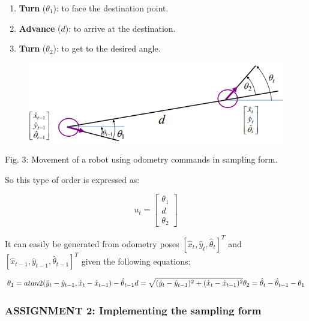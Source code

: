 \documentclass[11pt]{article}
\providecommand{\tightlist}{%
      \setlength{\itemsep}{0pt}\setlength{\parskip}{0pt}}
\begin{document}
\begin{enumerate}
\def\labelenumi{\arabic{enumi}.}
\tightlist
\item
  \textbf{Turn} (\(\theta_1\)): to face the destination point.
\item
  \textbf{Advance} (\(d\)): to arrive at the destination.
\item
  \textbf{Turn} (\(\theta_2\)): to get to the desired angle.
\end{enumerate}


\begin{figure}
\centering
\includegraphics{images/fig3-3-odometry_sample_form.PNG}
\end{figure}
Fig. 3: Movement of a robot using odometry commands in sampling form.

So this type of order is expressed as:

\[
    u_t = \begin{bmatrix}
            \theta_1  \\
            d \\
            \theta_2
        \end{bmatrix}
\]

It can easily be generated from odometry poses
\([\hat x_t, \hat y_t,\hat \theta_t]^T\) and
\([\hat x_{t-1}, \hat y_{t-1},\hat \theta_{t-1}]^T\) given the following
equations:

\[
    \begin{equation}
    \theta_1 =atan2(\hat y_t -\hat y_{t-1}, \hat x_t -\hat x_{t-1})- \hat \theta_{t-1} \\
    d = \sqrt{(\hat y_t -\hat y_{t-1})^2 + (\hat x_t -\hat x_{t-1})^2} \\
    \theta_2  = \hat{\theta}_t - \hat{\theta}_{t-1} - \theta_1
    \end{equation}
\]

    \hypertarget{assignment-2-implementing-the-sampling-form}{%
\subsubsection{\texorpdfstring{\textbf{{ASSIGNMENT 2: Implementing the
sampling
form}}}{ASSIGNMENT 2: Implementing the sampling form}}\label{assignment-2-implementing-the-sampling-form}}
\end{document}
